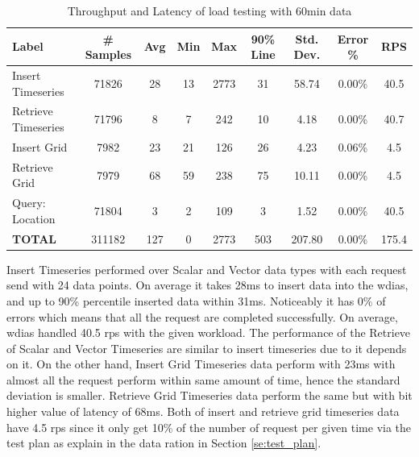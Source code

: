 \begin{table}[ht]
\caption{Throughput and Latency of load testing with 60min data}
\footnotesize
\begin{tabulary}{\linewidth}{|L|C|C|C|C|C|C|C|C|}
\hline
Label & \# Samples & Avg & Min & Max & 90\% Line & Std. Dev. & Error \% & RPS \\ \hline
Insert Timeseries & 71826 & 28 & 13 & 2773 & 31 & 58.74 & 0.00\% & 40.5 \\ \hline
Retrieve Timeseries & 71796 & 8 & 7 & 242 & 10 & 4.18 & 0.00\% & 40.7 \\ \hline
Insert Grid & 7982 & 23 & 21 & 126 & 26 & 4.23 & 0.06\% & 4.5 \\ \hline
Retrieve Grid & 7979 & 68 & 59 & 238 & 75 & 10.11 & 0.00\% & 4.5 \\ \hline
Query: Location & 71804 & 3 & 2 & 109 & 3 & 1.52 & 0.00\% & 40.5 \\ \hline
\textbf{TOTAL} & 311182 & 127 & 0 & 2773 & 503 & 207.80 & 0.00\% & 175.4 \\ \hline
\end{tabulary}
\label{tab:obs_all_60_min_summary}
\end{table}
Insert Timeseries performed over Scalar and Vector data types with each request send with 24 data points. On average it takes 28ms to insert data into the \acrshort{wdias}, and up to 90\% percentile inserted data within 31ms. Noticeably it has 0\% of errors which means that all the request are completed successfully. On average, \acrshort{wdias} handled 40.5 \acrshort{rps} with the given workload. The performance of the Retrieve of Scalar and Vector Timeseries are similar to insert timeseries due to it depends on it.
On the other hand, Insert Grid Timeseries data perform with 23ms with almost all the request perform within same amount of time, hence the standard deviation is smaller. Retrieve Grid Timeseries data perform the same but with bit higher value of latency of 68ms. Both of insert and retrieve grid timeseries data have 4.5 \acrshort{rps} since it only get 10\% of the number of request per given time via the test plan as explain in the data ration in Section \ref{se:test_plan}.


